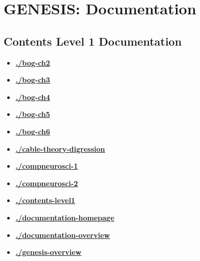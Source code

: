 \documentclass[12pt]{article}
\begin{document}
\section*{GENESIS: Documentation}

\subsection*{Contents Level 1 Documentation}

\begin{itemize}

\item \href{.././bog-ch2/./bog-ch2.pdf}{\bf \underline{./bog-ch2}}

\item \href{.././bog-ch3/./bog-ch3.pdf}{\bf \underline{./bog-ch3}}

\item \href{.././bog-ch4/./bog-ch4.pdf}{\bf \underline{./bog-ch4}}

\item \href{.././bog-ch5/./bog-ch5.pdf}{\bf \underline{./bog-ch5}}

\item \href{.././bog-ch6/./bog-ch6.pdf}{\bf \underline{./bog-ch6}}

\item \href{.././cable-theory-digression/./cable-theory-digression.pdf}{\bf \underline{./cable-theory-digression}}

\item \href{.././compneurosci-1/./compneurosci-1.pdf}{\bf \underline{./compneurosci-1}}

\item \href{.././compneurosci-2/./compneurosci-2.pdf}{\bf \underline{./compneurosci-2}}

\item \href{.././contents-level1/./contents-level1.pdf}{\bf \underline{./contents-level1}}

\item \href{.././documentation-homepage/./documentation-homepage.pdf}{\bf \underline{./documentation-homepage}}

\item \href{.././documentation-overview/./documentation-overview.pdf}{\bf \underline{./documentation-overview}}

\item \href{.././genesis-overview/./genesis-overview.pdf}{\bf \underline{./genesis-overview}}


\end{itemize}
\end{document}

